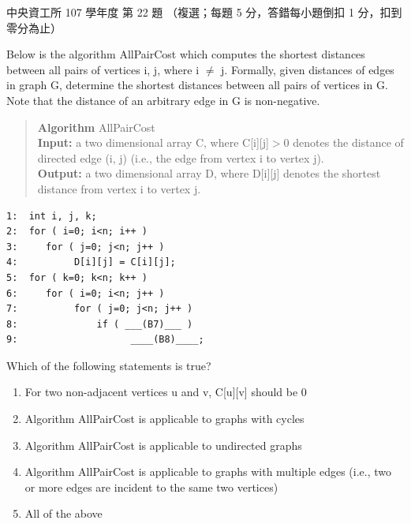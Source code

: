 \begin{pastexam}[label={px:ncu-107-dsa-22}]{中央資工所 107 學年度 第 22 題}
（複選；每題 5 分，答錯每小題倒扣 1 分，扣到零分為止）

Below is the algorithm AllPairCost which computes the shortest distances between all pairs of
vertices i, j, where i $\ne$ j. Formally, given distances of edges in graph G, determine the
shortest distances between all pairs of vertices in G. Note that the distance of an arbitrary edge
in G is non-negative.
\begin{quote}
\textbf{Algorithm} AllPairCost\\
\textbf{Input:} a two dimensional array C, where C[i][j]$>$0 denotes the distance of directed edge
(i, j) (i.e., the edge from vertex i to vertex j).\\
\textbf{Output:} a two dimensional array D, where D[i][j] denotes the shortest distance from
vertex i to vertex j.
\end{quote}
\begin{verbatim}
1:  int i, j, k;
2:  for ( i=0; i<n; i++ )
3:     for ( j=0; j<n; j++ )
4:          D[i][j] = C[i][j];
5:  for ( k=0; k<n; k++ )
6:     for ( i=0; i<n; j++ )
7:          for ( j=0; j<n; j++ )
8:              if ( ___(B7)___ )
9:                    ____(B8)____;
\end{verbatim}

Which of the following statements is true?
\begin{enumerate}[label=(\alph*)]
\item For two non-adjacent vertices u and v, C[u][v] should be 0
\item Algorithm AllPairCost is applicable to graphs with cycles
\item Algorithm AllPairCost is applicable to undirected graphs
\item Algorithm AllPairCost is applicable to graphs with multiple edges (i.e., two or more edges
are incident to the same two vertices)
\item All of the above
\end{enumerate}
\end{pastexam}

